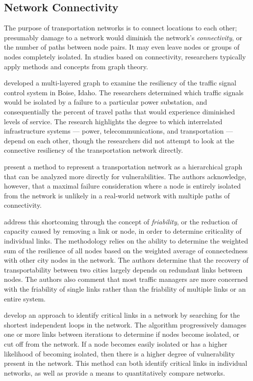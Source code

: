 \documentclass[3p, authoryear]{elsarticle} %
\begin{document}
\hypertarget{network-connectivity}{%
\subsection{Network Connectivity}\label{network-connectivity}}

The purpose of transportation networks is to connect locations to each other;
presumably damage to a network would diminish the network's \emph{connectivity}, or
the number of paths between node pairs. It may even leave nodes or groups of nodes
completely isolated. In studies based on connectivity, researchers typically apply
methods and concepts from graph theory.

\citet{abdel2007} developed a multi-layered graph to examine the resiliency of the traffic
signal control system in Boise, Idaho. The researchers determined which
traffic signals would be isolated by a failure to a particular power substation,
and consequentially the percent of travel paths that would experience diminished
levels of service. The research highlights the degree to which interrelated
infrastructure systems --- power, telecommunications, and transportation ---
depend on each other, though the researchers did not attempt to look at the
connective resiliency of the transportation network directly.

\citet{agarwal2011} present a method to represent a transportation network as a
hierarchical graph that can be analyzed more directly for vulnerabilities. The
authors acknowledge, however, that a maximal failure consideration where a node
is entirely isolated from the network is unlikely in a real-world network with
multiple paths of connectivity.

\citet{ip2011} address this shortcoming through the concept of \emph{friability}, or
the reduction of capacity caused by removing a link or node, in order to
determine criticality of individual links. The methodology relies on the ability
to determine the weighted sum of the resilience of all nodes based on the
weighted average of connectedness with other city nodes in the network. The
authors determine that the recovery of transportability between two cities
largely depends on redundant links between nodes. The authors also comment that
most traffic managers are more concerned with the friability of single links
rather than the friability of multiple links or an entire system.

\citet{vodak2019} develop an approach to identify
critical links in a network by searching for the shortest independent
loops in the network. The algorithm progressively damages one or more links
between iterations to determine if nodes become isolated, or cut off from the
network. If a node becomes easily isolated or has a higher likelihood of
becoming isolated, then there is a higher degree of vulnerability present in the
network. This method can both identify critical links in individual networks, as
well as provide a means to quantitatively compare networks.
\end{document}
